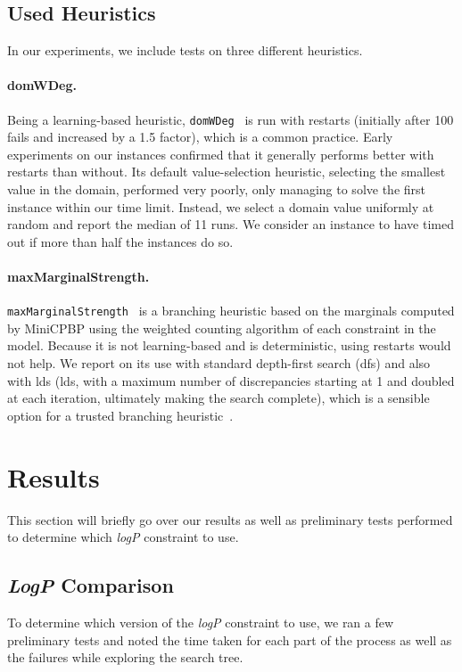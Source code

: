 \documentclass[../Document.tex]{subfiles}
\begin{document}
\subsection{Used Heuristics}
In our experiments, we include tests on three different heuristics.

\paragraph{domWDeg.} Being a learning-based heuristic, \texttt{domWDeg}~\cite{domwdeg} is run with restarts (initially after 100 fails and increased by a 1.5 factor), which is a common practice.
Early experiments on our instances confirmed that it generally performs better with restarts than without.
Its default value-selection heuristic, selecting the smallest value in the domain, performed very poorly, only managing to solve the first instance within our time limit.
Instead, we select a domain value uniformly at random and report the median of 11 runs. We consider an instance to have timed out if more than half the instances do so.

\paragraph{maxMarginalStrength.} \texttt{maxMarginalStrength}~\cite{GP:BP} is a branching heuristic based on the marginals computed by MiniCPBP using the weighted counting algorithm of each constraint in the model.
Because it is not learning-based and is deterministic, using restarts would not help.
We report on its use with standard depth-first search (\gls{dfs}) and also with \gls{lds} (\gls{lds}, with a maximum number of discrepancies starting at 1 and doubled at each iteration, ultimately making the search complete), which is a sensible option for a trusted branching heuristic~\cite{DBLP:conf/ijcai/HarveyG95}.


\section{Results}
This section will briefly go over our results as well as preliminary tests performed to determine which \emph{logP} constraint to use.

\subsection{\emph{LogP} Comparison}
To determine which version of the \emph{logP} constraint to use, we ran a few preliminary tests and noted the time taken for each part of the process as well as the failures while exploring the search tree.
\end{document}
